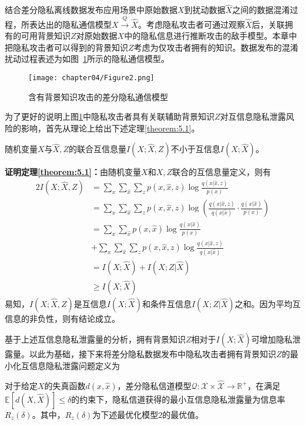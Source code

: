 结合差分隐私离线数据发布应用场景中原始数据$X$到扰动数据$\hat{X}$之间的数据混淆过程，所表达出的隐私通信模型$X\xrightarrow{Q}\hat{X}$。考虑隐私攻击者可通过观察$\hat{X}$后，关联拥有的可用背景知识$Z$对原始数据$X$中的隐私信息进行推断攻击的敌手模型。本章中把隐私攻击者可以得到的背景知识$Z$考虑为仅攻击者拥有的知识。数据发布的混淆扰动过程表述为如图~\ref{Fig:chapter05-2}所示的隐私通信模型。
\begin{figure}[htbp]
	\centering
	\texttt{[image: chapter04/Figure2.png]}
	\caption{含有背景知识攻击的差分隐私通信模型}
	\label{Fig:chapter05-2}
\end{figure}

为了更好的说明上图\ref{Fig:chapter05-2}中隐私攻击者具有关联辅助背景知识$Z$对互信息隐私泄露风险的影响，首先从理论上给出下述定理\ref{theorem:5.1}。
\begin{theorem} \label{theorem:5.1}随机变量$X$与$\hat{X},Z$的联合互信息量$I(X;\hat{X},Z)$不小于互信息$I(X;\hat{X})$。
\end{theorem}
\textbf{证明定理\ref{theorem:5.1}：}由随机变量$X$和$X,Z$联合的互信息量定义，则有
\begin{alignat}{2}
	I(X;\hat{X},Z) & =\sum_{x}\sum_{\hat{x}}\sum_{z}p(x,\hat{x},z)\log \frac{q(x|\hat{x},z)}{p(x)} \\
	 & = \sum_{x}\sum_{\hat{x}}\sum_{z}p(x,\hat{x},z)\log \left( \frac {q(x|\hat{x},z)}{q(x|\hat{x})}\cdot \frac{q(x|\hat{x})}{p(x)} \right)\\
	 & = \sum_{x}\sum_{\hat{x}}p(x,\hat{x})\log \frac{q(x|\hat{x})}{p(x)} \nonumber \\
	 & +\sum_{x}\sum_{\hat{x}}\sum_{z}p(x,\hat{x},z)\log \frac{q(x|\hat{x},z)}{q(x|\hat{x})}\\
	 & = I(X;\hat{X})+I(X;Z|\hat{X})\\
	 & \geq I(X;\hat{X})
\end{alignat}
易知，$I(X;\hat{X},Z)$是互信息$I(X;\hat{X})$和条件互信息$I(X;Z|\hat{X})$之和。因为平均互信息的非负性，则有结论成立。

基于上述互信息隐私泄露量的分析，拥有背景知识$Z$相对于$I(X;\hat{X})$可增加隐私泄露量。以此为基础，接下来将差分隐私数据发布中隐私攻击者拥有背景知识$Z$的最小化互信息隐私泄露问题定义为

\begin{definition}对于给定$X$的失真函数$d(x,\hat{x})$，差分隐私信道模型$\mathcal{Q}:\mathcal{X}\times \mathcal{\hat{X}}\rightarrow \mathbb{R}^{+}$，在满足$\mathbb{E}[d(X,\hat{X})]\leq \delta$的约束下，隐私信道获得的最小互信息隐私泄露量为信息率$R_{z}(\delta)$。其中，$R_{z}(\delta)$为下述最优化模型$2$的最优值。
\end{definition}

